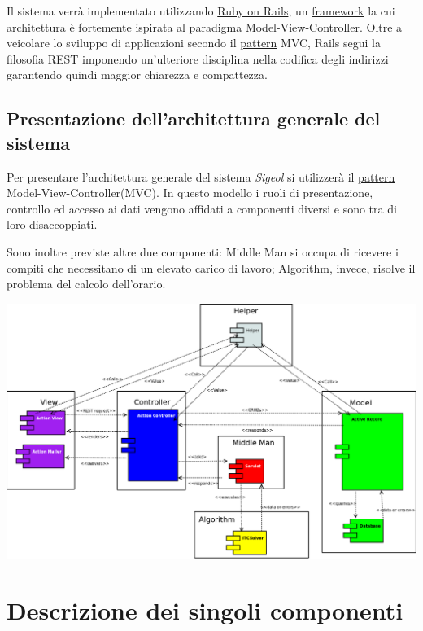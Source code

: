\documentclass[11pt,a4paper]{article}
\begin{document}
Il sistema verrà implementato utilizzando \underline{Ruby on Rails}, un \underline{framework} la cui architettura è fortemente ispirata al paradigma Model-View-Controller. 
Oltre a veicolare lo sviluppo di applicazioni secondo il \underline{pattern} MVC, Rails segui la filosofia REST imponendo un’ulteriore disciplina nella codifica degli indirizzi garantendo quindi maggior chiarezza e compattezza.


\subsection{Presentazione dell'architettura generale del sistema}
Per presentare l'architettura generale del sistema \textit{Sigeol} si utilizzerà il \underline{pattern} Model-View-Controller(MVC).
In questo modello i ruoli di presentazione, controllo ed accesso ai dati vengono affidati a componenti diversi e sono tra di loro disaccoppiati.

Sono inoltre previste altre due componenti: Middle Man si occupa di ricevere i compiti che necessitano di un elevato carico di lavoro; Algorithm, invece, risolve il problema del calcolo dell'orario.

\begin{center}
\includegraphics[scale=0.2]{images/component_diagram.png}
\end{center}

\section{Descrizione dei singoli componenti}
\end{document}
